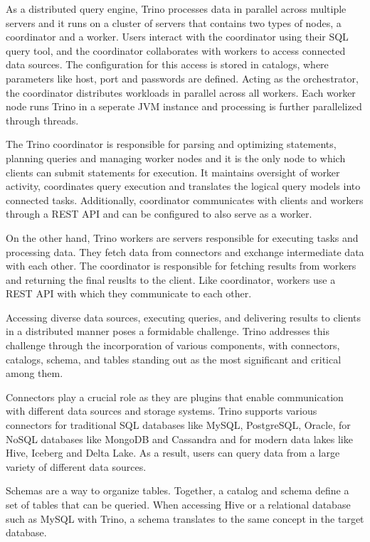 \documentclass[conference]{IEEEtran}
\begin{document}
As a distributed query engine, Trino processes data in parallel across multiple servers and it runs on a cluster of servers that contains two types of nodes, 
a coordinator and a worker. Users interact with the coordinator using their SQL query tool, and the coordinator collaborates with workers to access connected
data sources. The configuration for this access is stored in catalogs, where parameters like host, port and passwords are defined. Acting as the orchestrator,
the coordinator distributes workloads in parallel across all workers. Each worker node runs Trino in a seperate JVM instance and processing is further parallelized through threads.

The Trino coordinator is responsible for parsing and optimizing statements, planning queries and managing worker nodes and it is the only node to which clients can submit 
statements for execution. It maintains oversight of worker activity, coordinates query execution and translates the logical query models into connected tasks. Additionally, 
coordinator communicates with clients and workers through a REST API and can be configured to also serve as a worker.

On the other hand, Trino workers are servers responsible for executing tasks and processing data. They fetch data from connectors and exchange intermediate data with
each other. The coordinator is responsible for fetching results from workers and returning the final reuslts to the client. Like coordinator, workers use a REST API 
with which they communicate to each other.

Accessing diverse data sources, executing queries, and delivering results to clients in a distributed manner poses a formidable challenge. Trino addresses this challenge through 
the incorporation of various components, with connectors, catalogs, schema, and tables standing out as the most significant and critical among them.

Connectors play a crucial role as they are plugins that enable communication with different data sources and storage systems.
Trino supports various connectors for traditional SQL databases like MySQL, PostgreSQL, Oracle, for NoSQL databases like MongoDB and Cassandra and for modern data lakes like 
Hive, Iceberg and Delta Lake. As a result, users can query data from a large variety of different data sources.

Schemas are a way to organize tables. Together, a catalog and schema define a set of tables that can be queried. When accessing Hive or a relational database such as MySQL with Trino, 
a schema translates to the same concept in the target database. 
\end{document}
